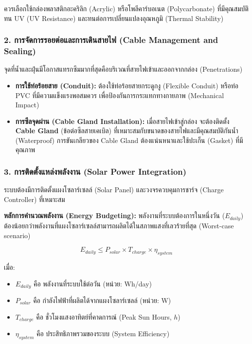 \documentclass[11pt,a4paper,openany]{report}
\begin{document}
ควรเลือกใช้กล่องพลาสติกอะคริลิก (Acrylic) หรือโพลีคาร์บอเนต (Polycarbonate) ที่มีคุณสมบัติทน UV (UV Resistance) และทนต่อการเปลี่ยนแปลงอุณหภูมิ (Thermal Stability)

\subsubsection{2. การจัดการรอยต่อและการเดินสายไฟ (Cable Management and Sealing)}

จุดที่น้ำและฝุ่นมีโอกาสแทรกซึมมากที่สุดคือบริเวณที่สายไฟเข้าและออกจากกล่อง (Penetrations)

\begin{itemize}
  \item \textbf{การใช้ท่อร้อยสาย (Conduit):} ต้องใช้ท่อร้อยสายกระดูกงู (Flexible Conduit) หรือท่อ PVC ที่มีความแข็งแรงพอสมควร เพื่อป้องกันการกระแทกทางกายภาพ (Mechanical Impact)
  \item \textbf{การซีลจุดผ่าน (Cable Gland Installation):} เมื่อสายไฟเข้าสู่กล่อง จะต้องติดตั้ง \textbf{Cable Gland} (ข้อต่อซีลสายเคเบิล) ที่เหมาะสมกับขนาดของสายไฟและมีคุณสมบัติกันน้ำ (Waterproof) การขันเกลียวของ Cable Gland ต้องแน่นหนาและใช้ปะเก็น (Gasket) ที่มีคุณภาพ
\end{itemize}


\subsubsection{3. การติดตั้งแหล่งพลังงาน (Solar Power Integration)}

ระบบต้องมีการติดตั้งแผงโซลาร์เซลล์ (Solar Panel) และวงจรควบคุมการชาร์จ (Charge Controller) ที่เหมาะสม

\textbf{หลักการคำนวณพลังงาน (Energy Budgeting):}
พลังงานที่ระบบต้องการในหนึ่งวัน ($E_{daily}$) ต้องน้อยกว่าพลังงานที่แผงโซลาร์เซลล์สามารถผลิตได้ในสภาพแสงที่เลวร้ายที่สุด (Worst-case scenario)

$$E_{daily} \le P_{solar} \times T_{charge} \times \eta_{system}$$


เมื่อ:
\begin{itemize}
  \item $E_{daily}$ คือ พลังงานที่ระบบใช้ต่อวัน (หน่วย: Wh/day)
  \item $P_{solar}$ คือ กำลังไฟฟ้าที่ผลิตได้จากแผงโซลาร์เซลล์ (หน่วย: W)
  \item $T_{charge}$ คือ ชั่วโมงแสงอาทิตย์ที่คาดการณ์ (Peak Sun Hours, $h$)
  \item $\eta_{system}$ คือ ประสิทธิภาพรวมของระบบ (System Efficiency)
\end{itemize}
\end{document}

